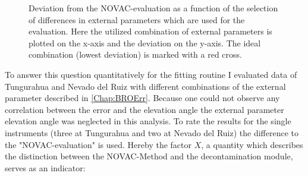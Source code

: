 \documentclass  [
  paper    = a4,
  BCOR     = 10mm,
  twoside,
  fontsize = 12pt,
  fleqn,
  toc      = bibnumbered,
  toc      = listofnumbered,
  numbers  = noendperiod,
  headings = normal,
  listof   = leveldown,
  version  = 3.03
]                                       {scrreprt}
\begin{document}
\begin{figure}
	\caption[Deviation from the NOVAC-evaluation as a function of the selection of differences in external parameters which are used for the evaluation.]{Deviation from the NOVAC-evaluation as a function of the selection of differences in external parameters which are used for the evaluation. Here the utilized combination of external parameters is plotted on the x-axis and the deviation on the y-axis. The ideal combination (lowest deviation) is marked with a red cross.}
	\label{fig:WelcheEP}
\end{figure}
To answer this question quantitatively for the fitting routine I evaluated data of Tungurahua and Nevado del Ruiz with different combinations of the external parameter described in \cref{Chap:BROErr}. Because one could not observe any correlation between the  error and the elevation angle the external parameter elevation angle was neglected in this analysis. To rate the results for the single instruments (three at Tungurahua and two at Nevado del Ruiz) the difference to the "NOVAC-evaluation" is used. Hereby the factor $X$, a quantity which describes the distinction between the NOVAC-Method and the decontamination module, serves as an indicator:
\end{document}
